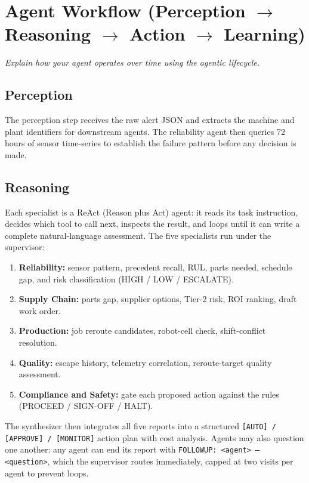 \documentclass[11pt,a4paper]{article}
\let\oldsection\section
\renewcommand{\section}{\needspace{7\baselineskip}\oldsection}
\let\oldsubsection\subsection
\renewcommand{\subsection}{\needspace{5\baselineskip}\oldsubsection}
\begin{document}
\section{Agent Workflow (Perception \(\rightarrow\) Reasoning \(\rightarrow\) Action \(\rightarrow\) Learning)}
\emph{Explain how your agent operates over time using the agentic lifecycle.}

\subsection*{Perception}
The perception step receives the raw alert JSON and extracts the machine and plant identifiers for downstream agents. The reliability agent then queries 72 hours of sensor time-series to establish the failure pattern before any decision is made.

\subsection*{Reasoning}
Each specialist is a ReAct (Reason plus Act) agent: it reads its task instruction, decides which tool to call next, inspects the result, and loops until it can write a complete natural-language assessment. The five specialists run under the supervisor:
\begin{enumerate}
  \item \textbf{Reliability:} sensor pattern, precedent recall, RUL, parts needed, schedule gap, and risk classification (HIGH / LOW / ESCALATE).
  \item \textbf{Supply Chain:} parts gap, supplier options, Tier-2 risk, ROI ranking, draft work order.
  \item \textbf{Production:} job reroute candidates, robot-cell check, shift-conflict resolution.
  \item \textbf{Quality:} escape history, telemetry correlation, reroute-target quality assessment.
  \item \textbf{Compliance and Safety:} gate each proposed action against the rules (PROCEED / SIGN-OFF / HALT).
\end{enumerate}
The synthesizer then integrates all five reports into a structured \texttt{[AUTO] / [APPROVE] / [MONITOR]} action plan with cost analysis. Agents may also question one another: any agent can end its report with \texttt{FOLLOWUP: <agent> -- <question>}, which the supervisor routes immediately, capped at two visits per agent to prevent loops.
\end{document}
